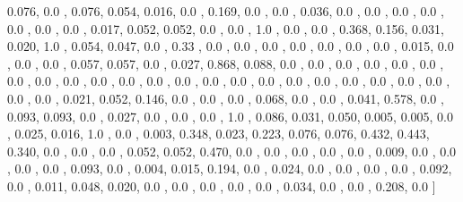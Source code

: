 \documentclass[usenames,dvipsnames]{article} %
\begin{document}
0.076, 0.0  , 0.076, 0.054, 0.016, 0.0  , 0.169, 0.0  , 0.0  , 0.036, 0.0  , 0.0  , 0.0  , 0.0  , 0.0  , 0.0  , 0.0  , 0.017, 0.052, 0.052, 0.0  , 0.0  , 1.0  , 0.0  , 0.0  , 0.368, 0.156, 0.031, 0.020, 1.0  , 0.054, 0.047, 0.0  , 0.33 , 0.0  , 0.0  , 0.0  , 0.0  , 0.0  , 0.0  , 0.0  , 0.015, 0.0  , 0.0  , 0.0  , 0.057, 0.057, 0.0  , 0.027, 0.868, 0.088, 0.0  , 0.0  , 0.0  , 0.0  , 0.0  , 0.0  , 0.0  , 0.0  , 0.0  , 0.0  , 0.0  , 0.0  , 0.0  , 0.0  , 0.0  , 0.0  , 0.0  , 0.0  , 0.0  , 0.0  , 0.0  , 0.0  , 0.0  , 0.0  , 0.021, 0.052, 0.146, 0.0  , 0.0  , 0.0  , 0.068, 0.0  , 0.0  , 0.041, 0.578, 0.0  , 0.093, 0.093, 0.0  , 0.027, 0.0  , 0.0  , 0.0  , 1.0  , 0.086, 0.031, 0.050, 0.005, 0.005, 0.0  , 0.025, 0.016, 1.0  , 0.0  , 0.003, 0.348, 0.023, 0.223, 0.076, 0.076, 0.432, 0.443, 0.340, 0.0  , 0.0  , 0.0  , 0.052, 0.052, 0.470, 0.0  , 0.0  , 0.0  , 0.0  , 0.0  , 0.009, 0.0  , 0.0  , 0.0  , 0.0  , 0.093, 0.0  , 0.004, 0.015, 0.194, 0.0  , 0.024, 0.0  , 0.0  , 0.0  , 0.0  , 0.092, 0.0  , 0.011, 0.048, 0.020, 0.0  , 0.0  , 0.0  , 0.0  , 0.0  , 0.034, 0.0  , 0.0  , 0.208, 0.0  ]
\end{document}
